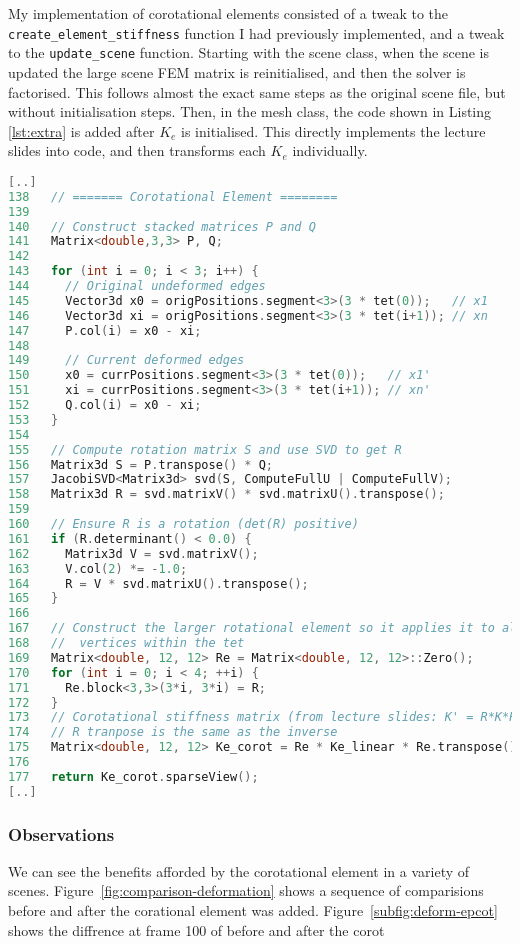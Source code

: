 \documentclass[11pt,a4paper]{article}
\renewcommand{\t}[1]{\texttt{#1}}
\begin{document}
My implementation of corotational elements consisted of a tweak to the \texttt{create\_element\_stiffness} function I had previously implemented, and a tweak to the \texttt{update\_scene} function. 
Starting with the scene class, when the scene is updated the large scene FEM matrix is reinitialised, and then the solver is factorised. 
This follows almost the exact same steps as the original scene file, but without initialisation steps. 
Then, in the mesh class, the code shown in Listing \ref{lst:extra} is added after $K_{e}$ is initialised.
This directly implements the lecture slides into code, and then transforms each $K_{e}$ individually.
\begin{lstlisting}[language=C++, style=BugHunterExact, caption={Source file: \t{mesh\_section3.h}, Function: \t{create\_element\_stiffness()}}, label={lst:extra}]
[..]
138   // ======= Corotational Element ========
139
140   // Construct stacked matrices P and Q
141   Matrix<double,3,3> P, Q;
142
143   for (int i = 0; i < 3; i++) {
144     // Original undeformed edges
145     Vector3d x0 = origPositions.segment<3>(3 * tet(0));   // x1
146     Vector3d xi = origPositions.segment<3>(3 * tet(i+1)); // xn
147     P.col(i) = x0 - xi; 
148            
149     // Current deformed edges
150     x0 = currPositions.segment<3>(3 * tet(0));   // x1'
151     xi = currPositions.segment<3>(3 * tet(i+1)); // xn'
152     Q.col(i) = x0 - xi;
153   }
154 
155   // Compute rotation matrix S and use SVD to get R 
156   Matrix3d S = P.transpose() * Q;
157   JacobiSVD<Matrix3d> svd(S, ComputeFullU | ComputeFullV);
158   Matrix3d R = svd.matrixV() * svd.matrixU().transpose();
159         
160   // Ensure R is a rotation (det(R) positive)
161   if (R.determinant() < 0.0) {
162     Matrix3d V = svd.matrixV();
163     V.col(2) *= -1.0;
164     R = V * svd.matrixU().transpose();
165   }
166 
167   // Construct the larger rotational element so it applies it to all 
168   //  vertices within the tet
169   Matrix<double, 12, 12> Re = Matrix<double, 12, 12>::Zero();
170   for (int i = 0; i < 4; ++i) {
171     Re.block<3,3>(3*i, 3*i) = R;
172   }
173   // Corotational stiffness matrix (from lecture slides: K' = R*K*R^-1)
174   // R tranpose is the same as the inverse 
175   Matrix<double, 12, 12> Ke_corot = Re * Ke_linear * Re.transpose();
176 
177   return Ke_corot.sparseView();
[..]
\end{lstlisting}


\subsubsection*{Observations}

We can see the benefits afforded by the corotational element in a variety of scenes. 
Figure~\ref{fig:comparison-deformation} shows a sequence of comparisions before and after the corational element was added. 
Figure~\ref{subfig:deform-epcot} shows the diffrence at frame 100 of before and after the corot
\end{document}
